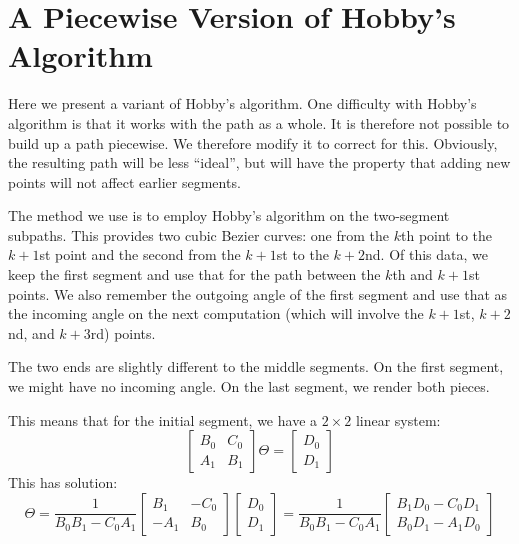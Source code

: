 \documentclass{article}
\begin{document}


\section{A Piecewise Version of Hobby's Algorithm}

Here we present a variant of Hobby's algorithm.
One difficulty with Hobby's algorithm is that it works with the path as a whole.
It is therefore not possible to build up a path piecewise.
We therefore modify it to correct for this.
Obviously, the resulting path will be less ``ideal'', but will have the property that adding new points will not affect earlier segments.

The method we use is to employ Hobby's algorithm on the two-{}segment subpaths.
This provides two cubic Bezier curves: one from the \(k\)th point to the \(k+1\)st point and the second from the \(k+1\)st to the \(k+2\)nd.
Of this data, we keep the first segment and use that for the path between the \(k\)th and \(k+1\)st points.
We also remember the outgoing angle of the first segment and use that as the incoming angle on the next computation (which will involve the \(k+1\)st, \(k+2\)nd, and \(k+3\)rd) points.

The two ends are slightly different to the middle segments.
On the first segment, we might have no incoming angle.
On the last segment, we render both pieces.

This means that for the initial segment, we have a \(2 \times 2\) linear system:
%
\[
  \begin{bmatrix}
  B_0 & C_0 \\
  A_1 & B_1
  \end{bmatrix}
  \Theta = \begin{bmatrix}
  D_0 \\ D_1
  \end{bmatrix}
\]
%
This has solution:
%
\[
  \Theta = \frac{1}{B_0 B_1 - C_0 A_1} \begin{bmatrix} B_1 & - C_0 \\ -A_1 & B_0 \end{bmatrix} \begin{bmatrix} D_0 \\ D_1 \end{bmatrix} =  \frac{1}{B_0 B_1 - C_0 A_1} \begin{bmatrix} B_1 D_0 - C_0 D_1 \\ B_0 D_1 - A_1 D_0 \end{bmatrix}
\]
\end{document}
